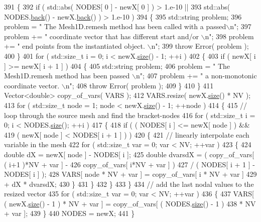 \begin{DoxyCode}
391   \{
392     \textcolor{keywordflow}{if} ( std::abs( NODES[ 0 ] - newX[ 0 ] ) > 1.e-10 ||
393          std::abs( NODES.\hyperlink{classLuna_1_1Vector_add6be56568d90c49e5f616e334275786}{back}() - newX.\hyperlink{classLuna_1_1Vector_add6be56568d90c49e5f616e334275786}{back}() ) > 1.e-10 )
394     \{
395       std::string problem;
396       problem = \textcolor{stringliteral}{" The Mesh1D.remesh method has been called with a passed\(\backslash\)n"};
397       problem += \textcolor{stringliteral}{" coordinate vector that has different start and/or \(\backslash\)n"};
398       problem += \textcolor{stringliteral}{" end points from the instantiated object. \(\backslash\)n"};
399       \textcolor{keywordflow}{throw} Error( problem );
400     \}
401     \textcolor{keywordflow}{for} ( std::size\_t i = 0; i < newX.\hyperlink{classLuna_1_1Vector_ac9b6ed7a0df401728f27c193fbc8f4d8}{size}() - 1; ++i )
402     \{
403       \textcolor{keywordflow}{if} ( newX[ i ] >= newX[ i + 1 ] )
404       \{
405         std::string problem;
406         problem = \textcolor{stringliteral}{" The Mesh1D.remesh method has been passed \(\backslash\)n"};
407         problem += \textcolor{stringliteral}{" a non-monotonic coordinate vector. \(\backslash\)n"};
408         \textcolor{keywordflow}{throw} Error( problem );
409       \}
410     \}
411     Vector<double> copy\_of\_vars( VARS );
412     VARS.resize( newX.\hyperlink{classLuna_1_1Vector_ac9b6ed7a0df401728f27c193fbc8f4d8}{size}() * NV );
413     \textcolor{keywordflow}{for} ( std::size\_t node = 1; node < newX.\hyperlink{classLuna_1_1Vector_ac9b6ed7a0df401728f27c193fbc8f4d8}{size}() - 1; ++node )
414     \{
415       \textcolor{comment}{// loop through the source mesh and find the bracket-nodes}
416       \textcolor{keywordflow}{for} ( std::size\_t i = 0; i < NODES.\hyperlink{classLuna_1_1Vector_ac9b6ed7a0df401728f27c193fbc8f4d8}{size}(); ++i )
417       \{
418         \textcolor{keywordflow}{if} ( ( NODES[ i ] <= newX[ node ] ) &&
419              ( newX[ node ] < NODES[ i + 1 ] ) )
420         \{
421           \textcolor{comment}{// linearly interpolate each variable in the mesh}
422           \textcolor{keywordflow}{for} ( std::size\_t var = 0; var < NV; ++var )
423           \{
424             \textcolor{keywordtype}{double} dX = newX[ node ] - NODES[ i ];
425             \textcolor{keywordtype}{double} dvarsdX = ( copy\_of\_vars[ ( i+1 )*NV + var ] -
426                                copy\_of\_vars[ i*NV + var ] )
427                              / ( NODES[ i + 1 ] - NODES[ i ] );
428             VARS[ node * NV + var ] =   copy\_of\_vars[ i * NV + var ]
429                                       + dX * dvarsdX;
430           \}
431         \}
432       \}
433     \}
434     \textcolor{comment}{// add the last nodal values to the resized vector}
435     \textcolor{keywordflow}{for} ( std::size\_t var = 0; var < NV; ++var )
436     \{
437       VARS[ ( newX.\hyperlink{classLuna_1_1Vector_ac9b6ed7a0df401728f27c193fbc8f4d8}{size}() - 1 ) * NV + var ] = copy\_of\_vars[ ( NODES.\hyperlink{classLuna_1_1Vector_ac9b6ed7a0df401728f27c193fbc8f4d8}{size}() - 1 )
438                                                             * NV + var ];
439     \}
440     NODES = newX;
441   \}
\end{DoxyCode}
